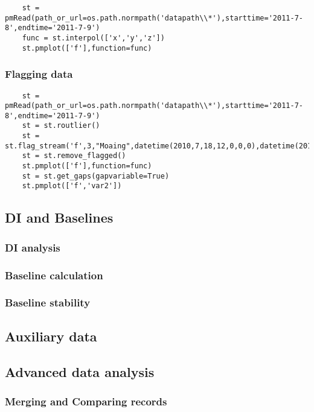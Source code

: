 \begin{verbatim}
    st = pmRead(path_or_url=os.path.normpath('datapath\\*'),starttime='2011-7-8',endtime='2011-7-9')
    func = st.interpol(['x','y','z'])
    st.pmplot(['f'],function=func)
\end{verbatim}

\subsubsection{Flagging data}

\begin{verbatim}
    st = pmRead(path_or_url=os.path.normpath('datapath\\*'),starttime='2011-7-8',endtime='2011-7-9')
    st = st.routlier()
    st = st.flag_stream('f',3,"Moaing",datetime(2010,7,18,12,0,0,0),datetime(2010,7,18,13,0,0,0))
    st = st.remove_flagged()
    st.pmplot(['f'],function=func)
    st = st.get_gaps(gapvariable=True)
    st.pmplot(['f','var2'])
\end{verbatim}


\subsection{DI and Baselines}

\subsubsection{DI analysis}

\subsubsection{Baseline calculation}

\subsubsection{Baseline stability}

\subsection{Auxiliary data}


\subsection{Advanced data analysis}

\subsubsection{Merging and Comparing records}

